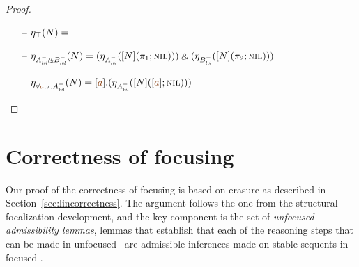 \begin{proof}
\begin{itemize}


\item[--] $\etana{N}{\top} = \top$ 
\item[--] $\etana{N}{A^-_\mlvl \with B^-_\mlvl}
           = \twithr
              {(\etana{[N](\tpione{\tnil})}{A^-_\mlvl})}
              {(\etana{[N](\tpitwo{\tnil})}{B^-_\mlvl})}$



\item[--] $\etana{N}{\forall \lf{a}{:}\tau.A^-_\mlvl}
           = \tforallr{\lf a}{(\etana{[N](\tforalll{\lf a}{\tnil})}{A^-_\mlvl})}$

\end{itemize}

\end{proof}

\section{Correctness of focusing}
\label{sec:ord-correctness}

Our proof of the correctness of focusing is based on erasure as
described in Section~\ref{sec:lincorrectness}. 
The argument follows the one from the
structural focalization development, and the key component is the
set of {\it
  unfocused admissibility lemmas}, lemmas that establish that each of
the reasoning steps that can be made in unfocused \ollll~are
admissible inferences made on stable sequents in focused \ollll.

